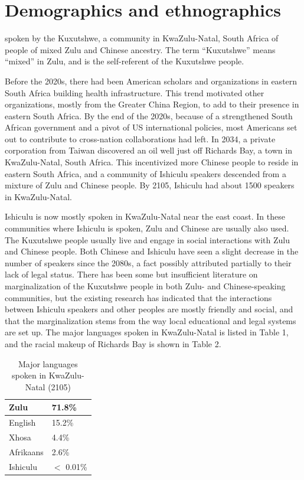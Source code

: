 
\chapter{Demographics and ethnographics}

 spoken by the Kuxutshwe, a community in KwaZulu-Natal, South Africa of people of mixed Zulu and Chinese ancestry. The term ``Kuxutshwe'' means ``mixed'' in Zulu, and is the self-referent of the Kuxutshwe people.

Before the 2020s, there had been American scholars and organizations in eastern South Africa building health infrastructure. This trend motivated other organizations, mostly from the Greater China Region, to add to their presence in eastern South Africa. By the end of the 2020s, because of a strengthened South African government and a pivot of US international policies, most Americans set out to contribute to cross-nation collaborations had left. In 2034, a private corporation from Taiwan discovered an oil well just off Richards Bay, a town in KwaZulu-Natal, South Africa. This incentivized more Chinese people to reside in eastern South Africa, and a community of Ishiculu speakers descended from a mixture of Zulu and Chinese people. By 2105, Ishiculu had about 1500 speakers in KwaZulu-Natal.

Ishiculu is now mostly spoken in KwaZulu-Natal near the east coast. In these communities where Ishiculu is spoken, Zulu and Chinese are usually also used. The Kuxutshwe people usually live and engage in social interactions with Zulu and Chinese people. Both Chinese and Ishiculu have seen a slight decrease in the number of speakers since the 2080s, a fact possibly attributed partially to their lack of legal status. There has been some but insufficient literature on marginalization of the Kuxutshwe people in both Zulu- and Chinese-speaking communities, but the existing research has indicated that the interactions between Ishiculu speakers and other peoples are mostly friendly and social, and that the marginalization stems from the way local educational and legal systems are set up. The major languages spoken in KwaZulu-Natal is listed in Table 1, and the racial makeup of Richards Bay is shown in Table 2.

\begin{table}
\centering
\begin{tabular}{l|l}
Zulu & 71.8\% \\
\hline
English & 15.2\% \\
\hline
Xhosa & 4.4\% \\
\hline
Afrikaans & 2.6\% \\
\hline
Ishiculu & $<$ 0.01\%
\end{tabular}
\caption{Major languages spoken in KwaZulu-Natal (2105)}
\end{table}

